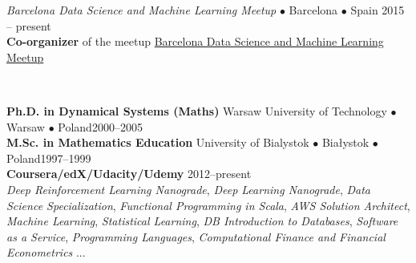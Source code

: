 \documentclass[a4paper, oneside]{scrreprt}
\begin{document}
\vspace{-0.3cm}

\noindent{}\textit{Barcelona Data Science and Machine Learning Meetup}
$\bullet$ Barcelona $\bullet$ Spain \hfill 2015 -- present\\
\noindent  \textbf{Co-organizer} of the meetup
  \href{https://www.meetup.com/es-ES/barcelona-data-science-machine-learning/}
  {Barcelona Data Science and Machine Learning Meetup}

\vspace{-0.1cm}
\noindent\makebox[\linewidth]{\rule{\textwidth}{0.4pt}}


\newpage

\ \\

\vspace{1.8cm}

\noindent\makebox[\linewidth]{\rule{\textwidth}{0.4pt}}


\vspace{0.2cm}

\noindent\textbf{Ph.D. in Dynamical Systems (Maths)} Warsaw University of Technology $\bullet$ Warsaw $\bullet$ Poland\hfill 2000--2005\\
\noindent\textbf{M.Sc. in Mathematics Education} University of Bialystok $\bullet$ Białystok $\bullet$ Poland\hfill 1997--1999\\
\noindent\textbf{Coursera/edX/Udacity/Udemy} \hfill 2012--present\\
\emph{Deep Reinforcement Learning Nanograde}, 
\emph{Deep Learning Nanograde}, \emph{Data Science Specialization}, \emph{Functional Programming in Scala}, 
\emph{AWS Solution Architect},
\emph{Machine Learning},  \emph{Statistical Learning}, 
\emph{DB Introduction to Databases}, \emph{Software as a Service}, 
\emph{Programming Languages}, 
\emph{Computational Finance and Financial Econometrics} ... \\
\noindent\makebox[\linewidth]{\rule{\textwidth}{0.4pt}}

\vspace{0.2cm}

\end{document}

